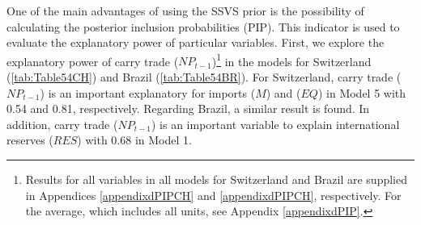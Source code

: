 \documentclass[a4paper, twoside]{templates/ociamthesis}
\begin{document}
\begin{table}[!ht]

\caption{\label{tab:Table53BR}First order serial autocorrelation of cross-country residuals (F-test) for Brazil}
\centering
{}
\end{table}

One of the main advantages of using the SSVS prior is the possibility of calculating the posterior inclusion probabilities (PIP). This indicator is used to evaluate the explanatory power of particular variables. First, we explore the explanatory power of carry trade (\(NP_{t-1}\))\footnote{Results for all variables in all models for Switzerland and Brazil are supplied in Appendices \ref{appendixdPIPCH} and \ref{appendixdPIPCH}, respectively. For the average, which includes all units, see Appendix \ref{appendixdPIP}.} in the models for Switzerland (\ref{tab:Table54CH}) and Brazil (\ref{tab:Table54BR}). For Switzerland, carry trade (\(NP_{t-1}\)) is an important explanatory for imports (\(M\)) and (\(EQ\)) in Model 5 with 0.54 and 0.81, respectively. Regarding Brazil, a similar result is found. In addition, carry trade (\(NP_{t-1}\)) is an important variable to explain international reserves (\(RES\)) with 0.68 in Model 1.
\end{document}
